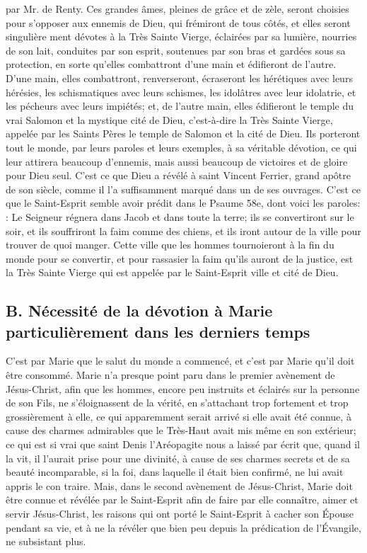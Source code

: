 par Mr. de Renty.
 Ces grandes âmes, pleines de grâce et de zèle, seront choisies pour s'opposer aux ennemis de Dieu, qui
frémiront de tous côtés, et elles seront singulière ment dévotes à la Très Sainte Vierge, éclairées par sa lumière,
nourries de son lait, conduites par son esprit, soutenues par son bras et gardées sous sa protection, en sorte
qu'elles combattront d'une main et édifieront de l'autre. D'une main, elles combattront, renverseront, écraseront les
hérétiques avec leurs hérésies, les schismatiques avec leurs schismes, les idolâtres avec leur idolatrie, et les
pécheurs avec leurs impiétés; et, de l'autre main, elles édifieront le temple du vrai Salomon et la mystique cité de
Dieu, c'est-à-dire la Très Sainte Vierge, appelée par les Saints Pères le temple de Salomon et la cité de Dieu. Ils
porteront tout le monde, par leurs paroles et leurs exemples, à sa véritable dévotion, ce qui leur attirera beaucoup
d'ennemis, mais aussi beaucoup de victoires et de gloire pour Dieu seul. C'est ce que Dieu a révélé à saint Vincent
Ferrier, grand apôtre de son siècle, comme il l'a suffisamment marqué dans un de ses ouvrages.
C'est ce que le Saint-Esprit semble avoir prédit dans le Psaume 58e, dont voici les paroles: : Le Seigneur régnera dans Jacob et dans toute la terre; ils se convertiront sur le soir, et ils souffriront la
faim comme des chiens, et ils iront autour de la ville pour trouver de quoi manger. Cette ville que les hommes
tournoieront à la fin du monde pour se convertir, et pour rassasier la faim qu'ils auront de la justice, est la Très
Sainte Vierge qui est appelée par le Saint-Esprit ville et cité de Dieu.
\subsection{B. Nécessité de la dévotion à Marie particulièrement dans les derniers temps}
 C'est par Marie que le salut du monde a commencé, et c'est par Marie qu'il doit être consommé. Marie n'a
presque point paru dans le premier avènement de Jésus-Christ, afin que les hommes, encore peu instruits et
éclairés sur la personne de son Fils, ne s'éloignassent de la vérité, en s'attachant trop fortement et trop
grossièrement à elle, ce qui apparemment serait arrivé si elle avait été connue, à cause des charmes admirables
que le Très-Haut avait mis même en son extérieur; ce qui est si vrai que saint Denis l'Aréopagite nous a laissé par
écrit que, quand il la vit, il l'aurait prise pour une divinité, à cause de ses charmes secrets et de sa beauté
incomparable, si la foi, dans laquelle il était bien confirmé, ne lui avait appris le con traire. Mais, dans le second
avènement de Jésus-Christ, Marie doit être connue et révélée par le Saint-Esprit afin de faire par elle connaître,
aimer et servir Jésus-Christ, les raisons qui ont porté le Saint-Esprit à cacher son Épouse pendant sa vie, et à ne
la révéler que bien peu depuis la prédication de l'Évangile, ne subsistant plus.
